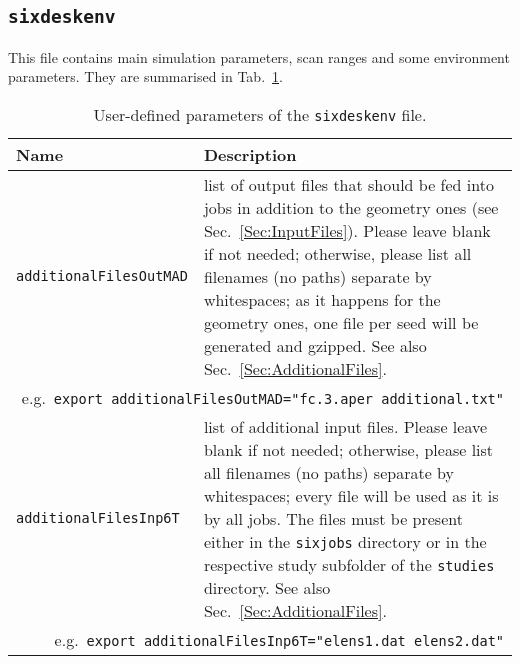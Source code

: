 \subsection{\texttt{sixdeskenv}}\label{Sec:InputFiles:sixdeskenv}
This file contains main simulation parameters, scan ranges and some environment
parameters.
They are summarised in Tab.~\ref{tab:sixdeskenv}.
\begin{table}[h]
\begin{center}
    \caption{User-defined parameters of the \texttt{sixdeskenv} file.}
    \label{tab:sixdeskenv}
    \begin{tabular}{|p{5cm}|p{10cm}|}
    \hline
    \rowcolor{blue!30}
    \textbf{Name} & \textbf{Description} \\
    \hline
    \texttt{additionalFilesOutMAD} & list of \MADX{} output files that
    should be fed into \SIXTRACK{} jobs in addition to the geometry ones
    (see Sec.~\ref{Sec:InputFiles}). Please leave blank if not needed;
    otherwise, please list all filenames (no paths) separate by
    whitespaces; as it happens for the geometry ones, one file per seed
    will be generated and gzipped. See also Sec.~\ref{Sec:AdditionalFiles}. \\
    \multicolumn{2}{|r|}{e.g.~\texttt{export additionalFilesOutMAD="fc.3.aper additional.txt"} } \\
    \hline
    \texttt{additionalFilesInp6T} & list of additional \SIXTRACK{} input files.
    Please leave blank if not needed; otherwise, please list all filenames
    (no paths) separate by whitespaces; every file will be used as it is
    by all \SIXTRACK{} jobs. The files must be present either in the
    \texttt{sixjobs} directory or in the respective study subfolder of
    the \texttt{studies} directory. See also Sec.~\ref{Sec:AdditionalFiles}. \\
    \multicolumn{2}{|r|}{e.g.~\texttt{export additionalFilesInp6T="elens1.dat elens2.dat"} } \\
    \hline
    \end{tabular}
\end{center}
\end{table}


